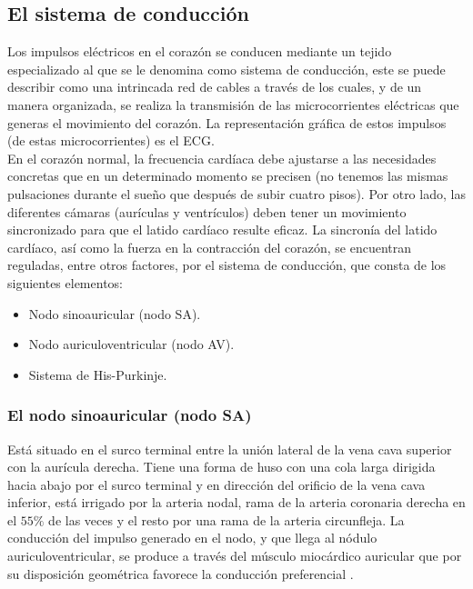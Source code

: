 \documentclass[12pt,letterpaper,oneside,openright]{book}
\begin{document}
	\subsection{El sistema de conducción}
	Los impulsos eléctricos en el corazón se conducen mediante un tejido especializado al que se le denomina como sistema de conducción, este se puede describir como una intrincada red de cables a través de los cuales, y de un manera organizada, se realiza la transmisión de las microcorrientes eléctricas que generas el movimiento del corazón. La representación gráfica de estos impulsos (de estas microcorrientes) es el ECG. \\
	En el corazón normal, la frecuencia cardíaca debe ajustarse a las necesidades concretas que en un determinado momento se precisen (no tenemos las mismas pulsaciones durante el sueño que después de subir cuatro pisos). Por otro lado, las diferentes cámaras (aurículas y ventrículos) deben tener un movimiento sincronizado para que el latido cardíaco resulte eficaz. La sincronía del latido cardíaco, así como la fuerza en la contracción del corazón, se encuentran reguladas, entre otros factores, por el sistema de conducción, que consta de los siguientes elementos: 
	\begin{itemize}
		\item Nodo sinoauricular (nodo SA).
		\item Nodo auriculoventricular (nodo AV).
		\item Sistema de His-Purkinje.
	\end{itemize}
	
	\subsubsection*{El nodo sinoauricular (nodo SA)} 
	Está situado en el surco terminal entre la unión lateral de la vena cava superior con la aurícula derecha. Tiene una forma de huso con una cola larga dirigida hacia abajo por el surco terminal y en dirección del orificio de la vena cava inferior, está irrigado por la arteria nodal, rama de la arteria coronaria derecha en el $55\%$ de las veces y el resto por una rama de la arteria circunfleja. La conducción del impulso generado en el nodo, y que llega al nódulo auriculoventricular, se produce a través del músculo miocárdico auricular que por su disposición geométrica favorece la conducción preferencial \cite{fbbva}. 
\end{document}
